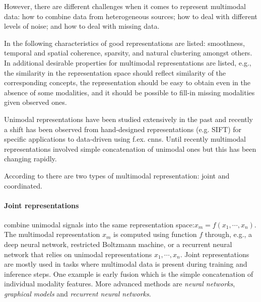 However, there are different challenges when it comes to represent multimodal data: how to combine data from heterogeneous sources; how to deal with different levels of noise; and how to deal with missing data.  \cite{Baltruvsaitis2017multimodal}

In \cite{Bengio2013representation} the following characteristics of good representations are listed: smoothness, temporal and spatial coherence, sparsity, and natural clustering amongst others. In \cite{Srivastava2012} additional desirable properties for multimodal representations are listed, e.g., the similarity in the representation space should reflect similarity of the corresponding concepts, the representation should be easy to obtain even in the absence of some modalities, and it should be possible to fill-in missing modalities given observed ones.

Unimodal representations have been studied extensively in the past and recently a shift has been observed from hand-designed representations (e.g. SIFT) for specific applications to data-driven using f.ex. \glspl{cnn}. Until recently multimodal representations involved simple concatenation of unimodal ones but this has been changing rapidly.

According to \cite{Baltruvsaitis2017multimodal} there are two types of multimodal representation: joint and coordinated. 

\paragraph{Joint representations} combine unimodal signals into the same representation space:$x_m = f(x_1, \cdots, x_n)$.
The multimodal representation $x_m$ is computed using function $f$ through, e.g., a deep neural network, restricted Boltzmann machine, or a recurrent neural network that relies on unimodal representations $x_1,\cdots, x_n $. 
Joint representations are mostly used in tasks where multimodal data is present during training and inference steps. One example is early fusion which is the simple concatenation of individual modality features. More advanced methods are \textit{neural networks}, \textit{graphical models} and \textit{recurrent neural networks}.

